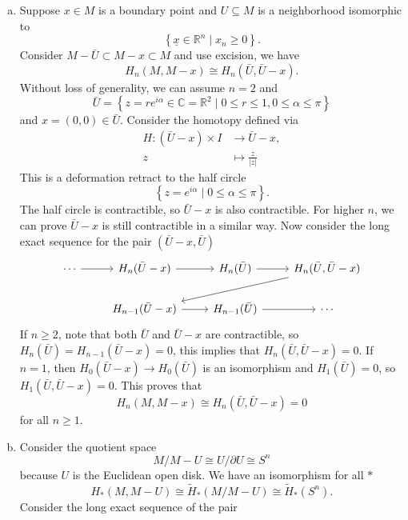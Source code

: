 \documentclass[letterpaper, 12pt]{article}
\begin{document}
\begin{solution}
\begin{enumerate}[(a)]
\item Suppose \(x\in M\) is a boundary point and \(U\subseteq M\) is a neighborhood isomorphic to 
\[\left\{ \underline{x}\in \mathbb{R}^n\mid x_n\geq 0 \right\}.\] 
Consider \(M-\bar{U}\subset M-x\subset M\) and use excision, we have 
\[H_n(M,M-x)\cong H_n(\bar{U},\bar{U}-x).\]
Without loss of generality, we can assume \(n=2\) and 
\[\bar{U}=\left\{ z=re^{i\alpha}\in \mathbb{C}=\mathbb{R}^2\mid 0\leq r\leq 1, 0\leq \alpha\leq \pi \right\}\]
and \(x=(0,0)\in \bar{U} \). Consider the homotopy defined via 
\begin{align*}
    H:(\bar{U}-x)\times I&\rightarrow \bar{U}-x,\\ 
      z&\mapsto \frac{z}{|z|}
\end{align*}
This is a deformation retract to the half circle 
\[\left\{ z=e^{i\alpha}\mid 0\leq \alpha\leq \pi \right\}.\]
The half circle is contractible, so \(\bar{U}-x\) is also contractible. For higher \(n\), we can prove \(\bar{U}-x\) is still contractible in a similar way. Now consider the long exact sequence for the pair \((\bar{U}-x,\bar{U})\)
\[\begin{tikzcd}
	\cdots & {H_n(\bar{U}-x)} & {H_n(\bar{U})} & {H_n(\bar{U},\bar{U}-x)} \\
	& {H_{n-1}(\bar{U}-x)} & {H_{n-1}(\bar{U})} & \cdots
	\arrow[from=1-1, to=1-2]
	\arrow[from=1-2, to=1-3]
	\arrow[from=1-3, to=1-4]
	\arrow[from=1-4, to=2-2]
	\arrow[from=2-2, to=2-3]
	\arrow[from=2-3, to=2-4]
\end{tikzcd}\]
If \(n\geq 2\), note that both \(\bar{U}\) and \(\bar{U}-x\) are contractible, so \(H_n(\bar{U})=H_{n-1}(\bar{U}-x)=0\), this implies that \(H_n(\bar{U},\bar{U}-x)=0\). If \(n=1\), then \(H_0(\bar{U}-x)\rightarrow H_0(\bar{U})\) is an isomorphism and \(H_1(\bar{U})=0\), so \(H_1(\bar{U},\bar{U}-x)=0\). This proves that 
\[H_n(M,M-x)\cong H_n(\bar{U},\bar{U}-x)=0\]
for all \(n\geq 1\). 
\item Consider the quotient space 
\[M/M-U\cong U/\partial U\cong S^n\]
because \(U\) is the Euclidean open disk. We have an isomorphism for all \(*\)  
\[H_*(M,M-U)\cong \tilde{H}_*(M/M-U)\cong \tilde{H}_*(S^n).\]
Consider the long exact sequence of the pair 

\end{enumerate}
\end{solution}
\end{document}

